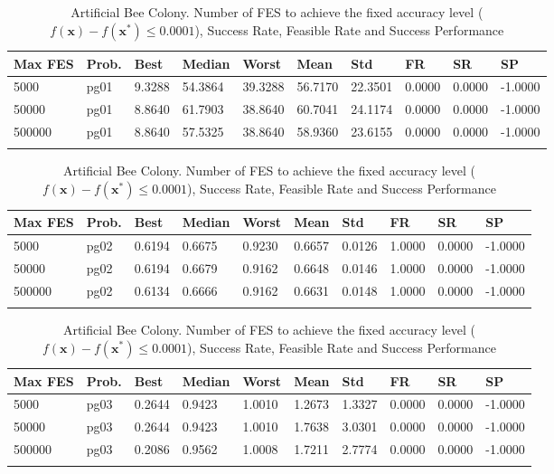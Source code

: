 \documentclass[10pt, a4paper]{book}
\begin{document}
\begin{center}
\begin{longtable}{l l l l l l l l l l}
\textbf{Max FES} & \textbf{Prob.} & \textbf{Best} & \textbf{Median} & \textbf{Worst} & \textbf{Mean} & \textbf{Std} & \textbf{FR} & \textbf{SR} & \textbf{SP} \\
\hline
5000 & pg01 & 9.3288 & 54.3864 & 39.3288 & 56.7170 & 22.3501 & 0.0000 & 0.0000 & -1.0000 \\
50000 & pg01 & 8.8640 & 61.7903 & 38.8640 & 60.7041 & 24.1174 & 0.0000 & 0.0000 & -1.0000 \\
500000 & pg01 & 8.8640 & 57.5325 & 38.8640 & 58.9360 & 23.6155 & 0.0000 & 0.0000 & -1.0000 \\

\caption{ Artificial Bee Colony. Number of FES to achieve the fixed accuracy level ($f(\mathbf{x}) - f(\mathbf{x}^{*}) \leq 0.0001$), Success Rate, Feasible Rate and Success Performance }
\end{longtable}
\end{center}

\begin{center}
\begin{longtable}{l l l l l l l l l l}
\textbf{Max FES} & \textbf{Prob.} & \textbf{Best} & \textbf{Median} & \textbf{Worst} & \textbf{Mean} & \textbf{Std} & \textbf{FR} & \textbf{SR} & \textbf{SP} \\
\hline
5000 & pg02 & 0.6194 & 0.6675 & 0.9230 & 0.6657 & 0.0126 & 1.0000 & 0.0000 & -1.0000 \\
50000 & pg02 & 0.6194 & 0.6679 & 0.9162 & 0.6648 & 0.0146 & 1.0000 & 0.0000 & -1.0000 \\
500000 & pg02 & 0.6134 & 0.6666 & 0.9162 & 0.6631 & 0.0148 & 1.0000 & 0.0000 & -1.0000 \\

\caption{ Artificial Bee Colony. Number of FES to achieve the fixed accuracy level ($f(\mathbf{x}) - f(\mathbf{x}^{*}) \leq 0.0001$), Success Rate, Feasible Rate and Success Performance }
\end{longtable}
\end{center}

\begin{center}
\begin{longtable}{l l l l l l l l l l}
\textbf{Max FES} & \textbf{Prob.} & \textbf{Best} & \textbf{Median} & \textbf{Worst} & \textbf{Mean} & \textbf{Std} & \textbf{FR} & \textbf{SR} & \textbf{SP} \\
\hline
5000 & pg03 & 0.2644 & 0.9423 & 1.0010 & 1.2673 & 1.3327 & 0.0000 & 0.0000 & -1.0000 \\
50000 & pg03 & 0.2644 & 0.9423 & 1.0010 & 1.7638 & 3.0301 & 0.0000 & 0.0000 & -1.0000 \\
500000 & pg03 & 0.2086 & 0.9562 & 1.0008 & 1.7211 & 2.7774 & 0.0000 & 0.0000 & -1.0000 \\

\caption{ Artificial Bee Colony. Number of FES to achieve the fixed accuracy level ($f(\mathbf{x}) - f(\mathbf{x}^{*}) \leq 0.0001$), Success Rate, Feasible Rate and Success Performance }
\end{longtable}
\end{center}
\end{document}
